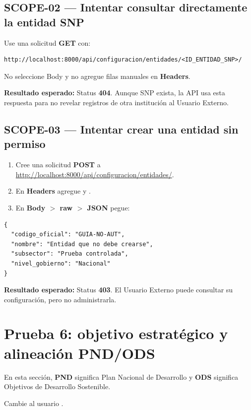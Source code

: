 \documentclass[11pt,a4paper]{article}
\newcommand{\esperado}[1]{\textcolor{VerdeResultado}{\textbf{Resultado esperado:}} #1}
\begin{document}
\subsection{SCOPE-02 --- Intentar consultar directamente la entidad SNP}

Use una solicitud \textbf{GET} con:

\begin{lstlisting}
http://localhost:8000/api/configuracion/entidades/<ID_ENTIDAD_SNP>/
\end{lstlisting}

No seleccione Body y no agregue filas manuales en \textbf{Headers}.

\esperado{Status \textbf{404}. Aunque SNP exista, la API usa esta respuesta para no revelar registros de otra institución al Usuario Externo.}

\subsection{SCOPE-03 --- Intentar crear una entidad sin permiso}

\begin{enumerate}
  \item Cree una solicitud \textbf{POST} a \url{http://localhost:8000/api/configuracion/entidades/}.
  \item En \textbf{Headers} agregue  y .
  \item En \textbf{Body $>$ raw $>$ JSON} pegue:
\end{enumerate}

\begin{lstlisting}
{
  "codigo_oficial": "GUIA-NO-AUT",
  "nombre": "Entidad que no debe crearse",
  "subsector": "Prueba controlada",
  "nivel_gobierno": "Nacional"
}
\end{lstlisting}

\esperado{Status \textbf{403}. El Usuario Externo puede consultar su configuración, pero no administrarla.}

\section{Prueba 6: objetivo estratégico y alineación PND/ODS}

En esta sección, \textbf{PND} significa Plan Nacional de Desarrollo y \textbf{ODS} significa Objetivos de Desarrollo Sostenible.

Cambie al usuario .
\end{document}
